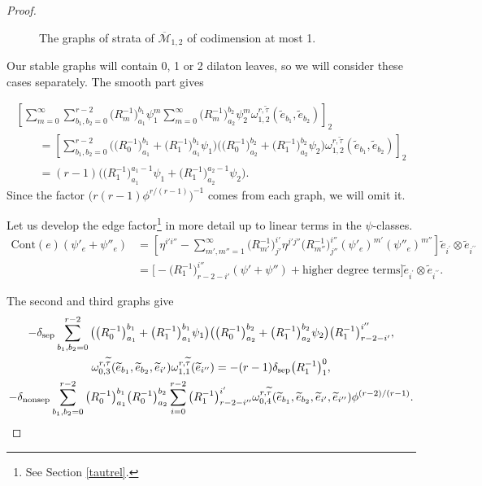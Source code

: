 \documentclass[10pt,a4paper]{amsart}
\def\oM{\overline{\mathcal{M}}}
\numberwithin{equation}{section}
\begin{document}
\begin{proof}
\begin{figure}[t]
\caption{The graphs of strata of \texorpdfstring{$\oM_{1,2}$}{M 1,2} of codimension at most 1.}	\label{fig:chefigura}
\end{figure}


Our stable graphs will contain 0, 1 or 2 dilaton leaves, so we will consider these cases separately. The smooth part gives

\begin{gather*}
 \left[\sum_{m=0}^{\infty}\sum^{r-2}_{b_1,b_2=0} \big(R_m^{-1}\big)^{b_1}_{a_1}\psi_1^m \sum_{m=0}^{\infty} \big(R_m^{-1}\big)^{b_2}_{a_2}\psi_2^m \omega ^{r,\widetilde{\tau}}_{1,2}(\widetilde{e}_{b_1},\widetilde{e}_{b_2})\right]_2\\
\qquad=\left[\sum_{b_1,b_2=0}^{r-2}\big(\big(R_0^{-1}\big)^{b_1}_{a_1}+\big(R_1^{-1}\big)^{b_1}_{a_1}\psi_1\big)
\big(\big(R_0^{-1}\big)^{b_2}_{a_2}+\big(R_1^{-1}\big)^{b_2}_{a_2}\psi_2\big) \omega ^{r,\widetilde{\tau}}_{1,2}(\widetilde{e}_{b_1},\widetilde{e}_{b_2})\right]_2\\
\qquad=(r-1)\big(\big(R_1^{-1}\big)^{a_1-1}_{a_1}\psi_1+\big(R_1^{-1}\big)^{a_2-1}_{a_2}\psi_2\big).
\end{gather*}
Since the factor $\bigl(r(r-1)\phi^{r/(r-1)}\bigr)^{-1}$ comes from each graph, we will omit it.

Let us develop the edge factor\footnote{See Section \ref{tautrel}.} in more detail up to linear terms in the $\psi$-classes.
\begin{align*}
\mathrm{Cont}(e)(\psi'_e+\psi''_e) &= \left[\eta^{i'i''}-\sum_{m',m''=1}^\infty \big(R^{-1}_{m'}\big)_{j'}^{i'} \eta^{j'j''} \big(R^{-1}_{m''}\big)_{j''}^{i''} (\psi'_e)^{m'}(\psi''_e)^{m''}\right]\widetilde{e}_{i^\prime}\otimes\widetilde{e}_{i^{\prime\prime}}\\
&=\bigl[-\big(R_1^{-1}\big)^{i''}_{r-2-i'}(\psi'+\psi'') + \text{higher degree terms}\bigr]\widetilde{e}_{i^\prime}\otimes\widetilde{e}_{i^{\prime\prime}} .
\end{align*}

The second and third graphs give
\begin{gather*}
 -\delta_{\rm sep}\sum_{b_1,b_2=0}^{r-2}\big(\big(R_0^{-1}\big)^{b_1}_{a_1}+\big(R_1^{-1}\big)^{b_1}_{a_1}\psi_1\big)
\big(\big(R_0^{-1}\big)^{b_2}_{a_2}+\big(R_1^{-1}\big)^{b_2}_{a_2}\psi_2\big)\big(R_1^{-1}\big)^{i''}_{r-2-i'},\\
\omega ^{r,\widetilde{\tau}}_{0,3}(\widetilde{e}_{b_1},\widetilde{e}_{b_2},\widetilde{e}_{i'})\omega ^{r,\widetilde{\tau}}_{1,1}
(\widetilde{e}_{i''})
=-(r-1)\delta_{\rm sep}\big(R_1^{-1}\big)^{0}_{1},\\
 -\delta_{\rm nonsep} \sum_{b_1,b_2=0}^{r-2} \big(R_0^{-1}\big)^{b_1}_{a_1}\big(R_0^{-1}\big)^{b_2}_{a_2}
 \sum_{i=0}^{r-2}\big(R_1^{-1}\big)^{i'}_{r-2-i''}
\omega ^{r,\widetilde{\tau}}_{0,4}(\widetilde{e}_{b_1},\widetilde{e}_{b_2},\widetilde{e}_{i'},\widetilde{e}_{i''}) \phi^{(r-2)/(r-1)}.
\end{gather*}


\end{proof}
\end{document}
